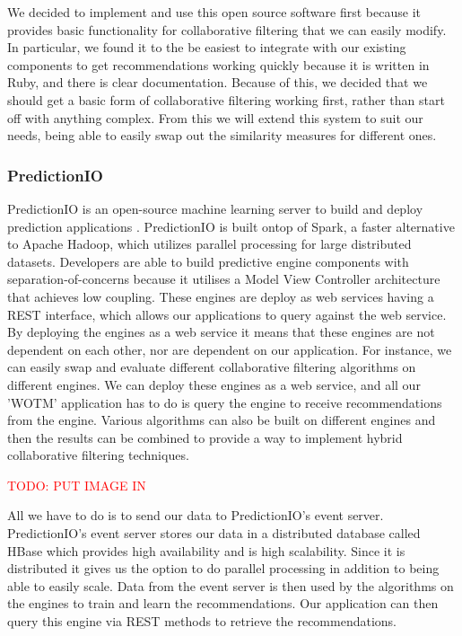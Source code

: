 We decided to implement and use this open source software first because it provides basic functionality for collaborative filtering that we can easily modify. In particular, we found it to the be easiest to integrate with our existing components to get recommendations working quickly because it is written in Ruby, and there is clear documentation. Because of this, we decided that we should get a basic form of collaborative filtering working first, rather than start off with anything complex. From this we will extend this system to suit our needs, being able to easily swap out the similarity measures for different ones. 

\subsubsection{PredictionIO}

PredictionIO is an open-source machine learning server to build and deploy prediction applications \cite{predictionio, predictionio2}. PredictionIO is built ontop of Spark, a faster alternative to Apache Hadoop, which utilizes parallel processing for large distributed datasets. Developers are able to build predictive engine components with separation-of-concerns because it utilises a Model View Controller architecture that achieves low coupling. These engines are deploy as web services having a REST interface, which allows our applications to query against the web service. By deploying the engines as a web service it means that these engines are not dependent on each other, nor are dependent on our application. For instance, we can easily swap and evaluate different collaborative filtering algorithms on different engines. We can deploy these engines as a web service, and all our 'WOTM' application has to do is query the engine to receive recommendations from the engine. Various algorithms can also be built on different engines and then the results can be combined to provide a way to implement hybrid collaborative filtering techniques. 

\textcolor{red}{TODO: PUT IMAGE IN}

All we have to do is to send our data to PredictionIO's event server. PredictionIO's event server stores our data in a distributed database called HBase which provides high availability and is high scalability. Since it is distributed it gives us the option to do parallel processing in addition to being able to easily scale. Data from the event server is then used by the algorithms on the engines to train and learn the recommendations. Our application can then query this engine via REST methods to retrieve the recommendations. 

